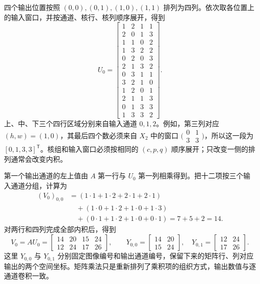 四个输出位置按照 $(0,0),(0,1),(1,0),(1,1)$ 排列为四列。依次取各位置上的输入窗口，并按通道、核行、核列顺序展开，得到
\begin{equation}
  U_0=
  \left[\begin{array}{rrrr}
  1&2&1&1\\
  2&0&1&3\\
  1&1&0&2\\
  1&3&2&2\\\hline
  0&2&0&3\\
  2&1&3&2\\
  0&3&1&1\\
  3&2&1&0\\\hline
  1&2&0&1\\
  2&1&1&3\\
  0&1&3&3\\
  1&3&3&2
  \end{array}\right].
  \label{l11:eq:small_unroll}
\end{equation}
上、中、下三个四行区域分别来自输入通道 $0,1,2$。例如，第三列对应 $(h,w)=(1,0)$，其最后四个数必须来自 $X_2$ 中的窗口 $\bigl(\begin{smallmatrix}0&1\\3&3\end{smallmatrix}\bigr)$，所以这一段为 $[0,1,3,3]^{\mathsf T}$。核组和输入窗口必须按相同的 $(c,p,q)$ 顺序展开；只改变一侧的排列通常会改变内积。

第一个输出通道的左上值由 $A$ 第一行与 $U_0$ 第一列相乘得到。把十二项按三个输入通道分组，计算为
\begin{equation}
\begin{aligned}
  (V_0)_{0,0}
  &=(1\cdot1+1\cdot2+2\cdot1+2\cdot1)\\
  &\quad +(1\cdot0+1\cdot2+1\cdot0+1\cdot3)\\
  &\quad +(0\cdot1+1\cdot2+1\cdot0+0\cdot1)
   =7+5+2=14.
\end{aligned}
\label{l11:eq:small_dot}
\end{equation}
对两行和四列完成全部内积后，得到
\begin{equation}
  V_0=AU_0=
  \begin{bmatrix}14&20&15&24\\12&24&17&26\end{bmatrix},
  \qquad
  Y_{0,0}=\begin{bmatrix}14&20\\15&24\end{bmatrix},\quad
  Y_{0,1}=\begin{bmatrix}12&24\\17&26\end{bmatrix}.
  \label{l11:eq:small_matrix_output}
\end{equation}
这里 $Y_{0,0}$ 与 $Y_{0,1}$ 分别固定图像编号和输出通道编号，保留下来的矩阵行、列对应输出的两个空间坐标。矩阵乘法只是重新排列了乘积项的组织方式，输出数值与逐通道卷积一致。
